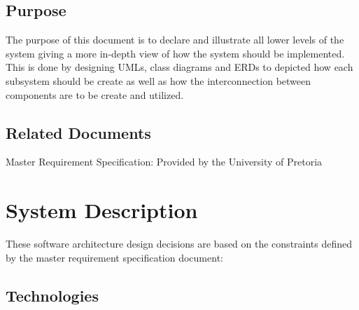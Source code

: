 \documentclass[12pt]{article}
\begin{document}
	\subsection{Purpose}

		\vspace{0.5cm}
		
		The purpose of this document is to declare and illustrate all lower levels of the system giving a more in-depth view of how the system should be implemented. This is done by designing UMLs, class diagrams and ERDs to depicted how each subsystem should be create as well as how the interconnection between components are to be create and utilized.

		\vspace{0.5cm}
		
	\subsection{Related Documents}

		\vspace{0.5cm}
		
		Master Requirement Specification: Provided by the University of Pretoria
		
		\vspace{0.5cm}

\section{System Description}

		\vspace{0.5cm}
		
These software architecture design decisions are based on the constraints defined by the master requirement specification document:

		\vspace{0.5cm}
		
	\subsection{Technologies}
	
		\vspace{0.5cm}
	
\end{document}
